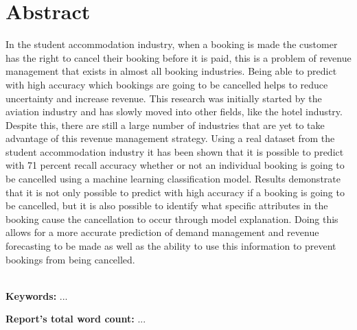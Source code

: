 \chapter*{\center \Large  Abstract}

In the student accommodation industry, when a booking is made the customer has the right to cancel their booking before it is paid, this is a problem of revenue management that exists in almost all booking industries. Being able to predict with high accuracy which bookings are going to be cancelled helps to reduce uncertainty and increase revenue. This research was initially started by the aviation industry and has slowly moved into other fields, like the hotel industry. Despite this, there are still a large number of industries that are yet to take advantage of this revenue management strategy. Using a real dataset from the student accommodation industry it has been shown that it is possible to predict with 71 percent recall accuracy whether or not an individual booking is going to be cancelled using a machine learning classification model. Results demonstrate that it is not only possible to predict with high accuracy if a booking is going to be cancelled, but it is also possible to identify what specific attributes in the booking cause the cancellation to occur through model explanation. Doing this allows for a more accurate prediction of demand management and revenue forecasting to be made as well as the ability to use this information to prevent bookings from being cancelled.

~\\[1cm]
\noindent
\textbf{Keywords:} ...

\vfill
\noindent
\textbf{Report's total word count:} ...

